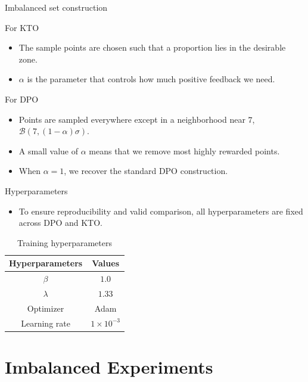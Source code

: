 \documentclass{beamer}
\begin{document}
\begin{frame}{Imbalanced set construction}
\begin{block}{For KTO}
    \begin{itemize}
        \item The sample points are chosen such that a proportion lies in the desirable zone.
        \item \(\alpha\) is the parameter that controls how much positive feedback we need.
    \end{itemize}
\end{block}

\begin{block}{For DPO}
    \begin{itemize}
        \item Points are sampled everywhere except in a neighborhood near \(7\), \(\mathcal{B}(7, (1-\alpha)\sigma)\).
        \item A small value of \(\alpha\) means that we remove most highly rewarded points.
        \item When \(\alpha = 1\), we recover the standard DPO construction.
    \end{itemize}
\end{block}
\end{frame}

\begin{frame}{Hyperparameters}
    \begin{itemize}
        \item To ensure reproducibility and valid comparison, all hyperparameters are fixed across DPO and KTO.
    \end{itemize}

    \begin{table}
        \centering
        \begin{tabular}{cc}
        \hline
            \textbf{Hyperparameters} & \textbf{Values}\\
            \hline
            \(\beta\) & \(1.0\)\\
            \(\lambda\) & \(1.33\)\\
            Optimizer & Adam\\
            Learning rate & \(1\times10^{-3}\)\\
            \hline
        \end{tabular}
        \caption{Training hyperparameters}
    \end{table}
\end{frame}

\section{Imbalanced Experiments}
\end{document}
